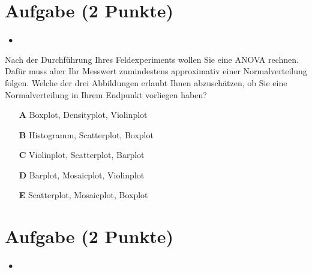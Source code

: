 \documentclass[a4paper, 9pt]{scrartcl}\usepackage[]{graphicx}\usepackage[]{xcolor}
\begin{document}
\section{Aufgabe \hfill (2 Punkte)}

\ifcollection
\begin{flushright}
\tiny\vspace{-2Ex}
\textbf{\examinhaltstart}
\exammodulestatversuch $\;\bullet$
\exammodulebiostat
\vspace{-1Ex}
\end{flushright}
\fi




Nach der Durchführung Ihres Feldexperiments wollen Sie eine ANOVA rechnen. Dafür muss aber Ihr Messwert zumindestens approximativ einer Normalverteilung folgen. Welche der drei Abbildungen erlaubt Ihnen abzuschätzen, ob Sie eine Normalverteilung in Ihrem Endpunkt vorliegen haben?





\begin{enumerate}
\item [\textbf{A} \msquare] Boxplot, Densityplot, Violinplot
\item [\textbf{B} \msquare] Histogramm, Scatterplot, Boxplot
\item [\textbf{C} \msquare] Violinplot, Scatterplot, Barplot
\item [\textbf{D} \msquare] Barplot, Mosaicplot, Violinplot
\item [\textbf{E} \msquare] Scatterplot, Mosaicplot, Boxplot
\end{enumerate}

\section{Aufgabe \hfill (2 Punkte)}


\ifcollection
\begin{flushright}
\tiny\vspace{-2Ex}
\textbf{\examinhaltstart}
\exammodulestatversuch $\;\bullet$
\exammodulebiostat
\vspace{-1Ex}
\end{flushright}
\fi
\end{document}
